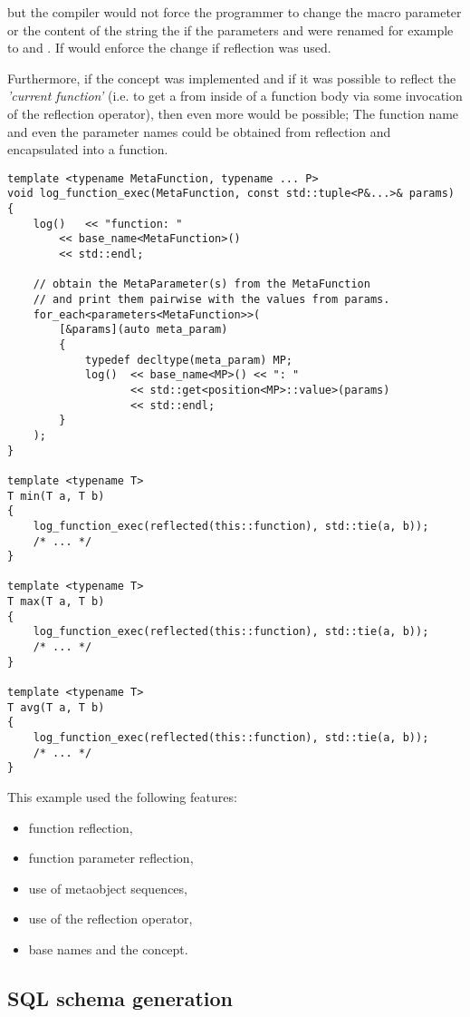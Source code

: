 but the compiler would not force the programmer to change the macro parameter
or the content of the string the if the parameters \verb@a@ and \verb@b@ were renamed
for example to \verb@first@ and \verb@second@. If would enforce the change if
reflection was used.

Furthermore, if the  concept was implemented
and if it was possible to reflect the {\em 'current function'} (i.e. to get a 
from inside of a function body via some invocation of the reflection operator),
then even more would be possible; The function name and even the parameter names could
be obtained from reflection and encapsulated into a function.

\begin{verbatim}
template <typename MetaFunction, typename ... P>
void log_function_exec(MetaFunction, const std::tuple<P&...>& params)
{
	log()   << "function: "
		<< base_name<MetaFunction>()
		<< std::endl;

	// obtain the MetaParameter(s) from the MetaFunction
	// and print them pairwise with the values from params.
	for_each<parameters<MetaFunction>>(
		[&params](auto meta_param)
		{
			typedef decltype(meta_param) MP;
			log()  << base_name<MP>() << ": "
			       << std::get<position<MP>::value>(params)
			       << std::endl;
		}
	);
}

template <typename T>
T min(T a, T b)
{
	log_function_exec(reflected(this::function), std::tie(a, b));
	/* ... */
}

template <typename T>
T max(T a, T b)
{
	log_function_exec(reflected(this::function), std::tie(a, b));
	/* ... */
}

template <typename T>
T avg(T a, T b)
{
	log_function_exec(reflected(this::function), std::tie(a, b));
	/* ... */
}
\end{verbatim}

This example used the following features:

\begin{itemize}
\item{function reflection,}
\item{function parameter reflection,}
\item{use of metaobject sequences,}
\item{use of the reflection operator,}
\item{base names and the  concept.}
\end{itemize}

\subsection{SQL schema generation}


